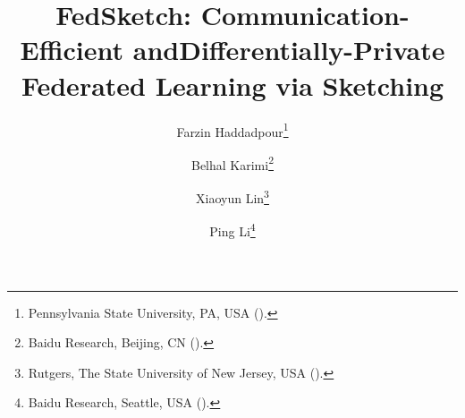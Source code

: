 

\usepackage{lipsum}
\usepackage{amsfonts}
\usepackage{graphicx}
\usepackage{epstopdf}
\usepackage{algorithmic}
\ifpdf
\else
\fi

\newcommand{\creflastconjunction}{, and~}



\title{FedSketch: Communication-Efficient andDifferentially-Private Federated Learning via Sketching}

\author{Farzin Haddadpour\thanks{Pennsylvania State University, PA, USA
  ().}
\and Belhal Karimi\thanks{Baidu Research, Beijing, CN 
  ().}
\and Xiaoyun Lin\thanks{Rutgers, The State University of New Jersey, USA
  ().}
 \and Ping Li\thanks{Baidu Research, Seattle, USA 
  ().}
  }

\usepackage{amsopn}
\DeclareMathOperator{\diag}{diag}


